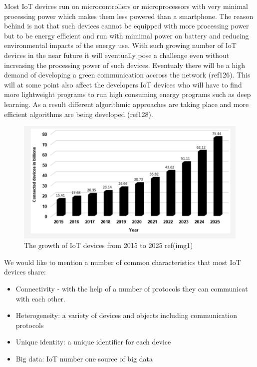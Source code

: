 Most IoT devices run on microcontrollers or microprocessors with very minimal processing power which makes them less powered than a smartphone. The reason behind is not that such devices cannot be equipped with more processing power but to be energy efficient and run with mimimal power on battery and reducing environmental impacts of the energy use. With such growing number of IoT devices in the near future it will eventually pose a challenge even without increasing the processing power of such devices. Eventualy there will be a high demand of developing a green communication accross the network (ref126). This will at some point also affect the developers IoT devices who will have to find more lightweight programs to run high consuming energy programs such as deep learning. As a result different algorithmic approaches are taking place and more efficient algorithms are being developed (ref128).






\begin{figure}[!htb]
    \centering
    \includegraphics[width=1\textwidth]{figures/number_of_iot.png}
    \caption{The growth of IoT devices from 2015 to 2025 ref(img1)}
    \label{fig:num_of_iot}
\end{figure}


We would like to mention a number of common characteristics that most IoT devices share: 

\begin{itemize}
    \item Connectivity - with the help of a number of protocols they can communicat with each other.
    \item Heterogeneity: a variety of devices and objects including communication protocols
    \item Unique identity: a unique identifier for each device 
    \item Big data: IoT number one source of big data 
\end{itemize}

